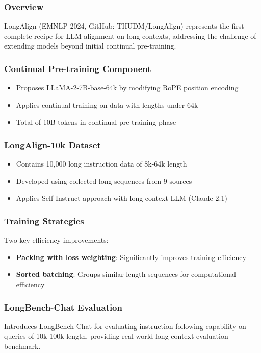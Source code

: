 \documentclass[11pt,letterpaper]{article}
\begin{document}
\subsubsection{Overview}
LongAlign (EMNLP 2024, GitHub: THUDM/LongAlign) represents the first complete recipe for LLM alignment on long contexts, addressing the challenge of extending models beyond initial continual pre-training.

\subsubsection{Continual Pre-training Component}
\begin{itemize}[leftmargin=*]
    \item Proposes LLaMA-2-7B-base-64k by modifying RoPE position encoding
    \item Applies continual training on data with lengths under 64k
    \item Total of 10B tokens in continual pre-training phase
\end{itemize}

\subsubsection{LongAlign-10k Dataset}
\begin{itemize}[leftmargin=*]
    \item Contains 10,000 long instruction data of 8k-64k length
    \item Developed using collected long sequences from 9 sources
    \item Applies Self-Instruct approach with long-context LLM (Claude 2.1)
\end{itemize}

\subsubsection{Training Strategies}
Two key efficiency improvements:
\begin{itemize}[leftmargin=*]
    \item \textbf{Packing with loss weighting}: Significantly improves training efficiency
    \item \textbf{Sorted batching}: Groups similar-length sequences for computational efficiency
\end{itemize}

\subsubsection{LongBench-Chat Evaluation}
Introduces LongBench-Chat for evaluating instruction-following capability on queries of 10k-100k length, providing real-world long context evaluation benchmark.
\end{document}
